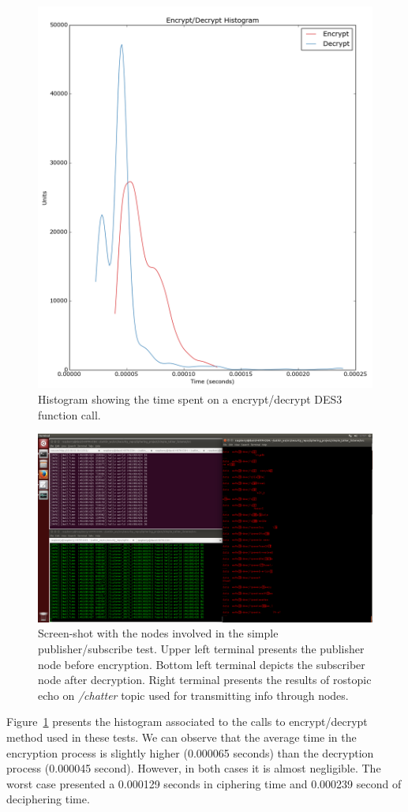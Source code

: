 \documentclass[journal,twoside]{JoPhA}
\begin{document}
\begin{figure}[ht]
	\centering
	\includegraphics[width=.5\textwidth]{figure_Simple_Publisher_subscriber1.png}
	\caption{Histogram showing the time spent on a encrypt/decrypt DES3 function call.}
	\label{fig:time_simple_text_CPU}
\end{figure}

\begin{figure}[ht!]
	\centering
	\includegraphics[width=.99\textwidth]{Screenshot_hello_world.png}
	\caption{Screen-shot with the nodes involved in the simple publisher/subscribe test. Upper left terminal presents the publisher node before encryption. Bottom left terminal depicts the subscriber node after decryption. Right terminal presents the results of rostopic echo on {\em /chatter} topic used for transmitting info through nodes.}
	\label{fig:screenshot_hello_world}
\end{figure}


Figure~\ref{fig:time_simple_text_CPU} presents the histogram associated to the calls to encrypt/decrypt method used in these tests.  We can observe that the average time in the encryption process is slightly higher (0.000065 seconds) than the decryption process (0.000045 second). However, in both cases it is almost negligible. The worst case presented a 0.000129 seconds in ciphering time and  0.000239 second of deciphering time.
\end{document}
